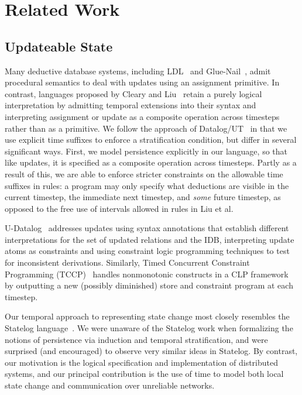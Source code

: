 \section{Related Work}


\subsection{Updateable State}

Many deductive database systems, including LDL~\cite{ldl} and Glue-Nail~\cite{glue-nail}, admit procedural semantics to deal with updates using an
assignment primitive.  In contrast, languages proposed by Cleary and Liu~\cite{harmful,deductiveupdates,starlog} retain a purely logical 
interpretation by admitting temporal extensions into their syntax and interpreting assignment or update as a composite operation
across timesteps~\cite{deductiveupdates} rather than as a primitive.  We follow the approach of Datalog/UT~\cite{deductiveupdates} in that we use explicit time suffixes to enforce a stratification condition,
but differ in several significant ways.
First, we model persistence explicitly in our language, so that like updates, it is specified as a composite operation across timesteps.
Partly as a result of this, we are able to enforce stricter constraints on the allowable time suffixes in rules: a program may only specify what deductions are visible
in the current timestep, the immediate next timestep, and \emph{some} future timestep, as opposed to the free use of intervals allowed in rules in Liu et al.  


U-Datalog~\cite{udatalog-neg} addresses updates using syntax annotations that establish different interpretations for the set of updated 
relations and the IDB, interpreting update atoms as constraints and using constraint logic programming techniques to test for inconsistent
derivations.  Similarly, Timed Concurrent Constraint Programming (TCCP)~\cite{tdccp,tccp} handles nonmonotonic constructs in a CLP framework
by outputting a new (possibly diminished) store and constraint program at each timestep.  

Our temporal approach to representing state change most closely resembles the
Statelog language~\cite{statelog}.  We were unaware of the Statelog work when formalizing the 
notions of persistence via induction and temporal stratification, and were surprised
(and encouraged) to observe very similar ideas in Statelog.  By contrast, our motivation is
the logical specification and implementation of distributed systems, and our 
principal contribution is the use of time to model both local state change and communication
over unreliable networks.

